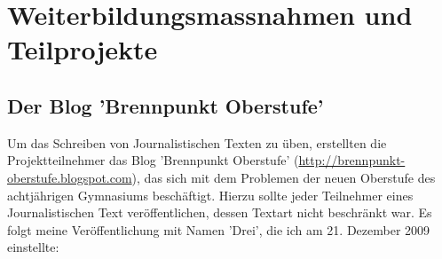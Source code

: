 \documentclass[a4paper,12pt,oneside]{scrbook}
\begin{document}
\section{Weiterbildungsmassnahmen und Teilprojekte}
\subsection{Der Blog 'Brennpunkt Oberstufe'}
Um das Schreiben von Journalistischen Texten zu üben, erstellten die Projektteilnehmer das Blog 'Brennpunkt Oberstufe' (\url{http://brennpunkt-oberstufe.blogspot.com}), das sich mit dem Problemen der neuen Oberstufe des achtjährigen Gymnasiums beschäftigt.
Hierzu sollte jeder Teilnehmer eines Journalistischen Text veröffentlichen, dessen Textart nicht beschränkt war.
Es folgt meine Veröffentlichung mit Namen 'Drei', die ich am 21. Dezember 2009 einstellte:
\end{document}
